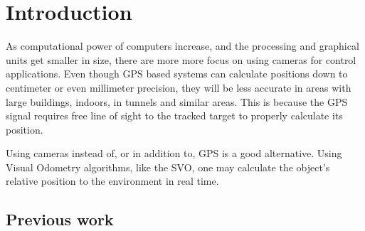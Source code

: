 
\chapter{Introduction} \label{sec:introduction}

As computational power of computers increase, and the processing and graphical units get smaller in size, there are more more focus on using cameras for control applications. Even though GPS based systems can calculate positions down to centimeter or even millimeter precision\cite{GPSaccuracy}, they will be less accurate in areas with large buildings, indoors, in tunnels and similar areas. This is because the GPS signal requires free line of sight to the tracked target to properly calculate its position.

Using cameras instead of, or in addition to, GPS is a good alternative. Using Visual Odometry algorithms, like the SVO\cite{SVOpaper}, one may calculate the object's relative position to the environment in real time.




\section{Previous work}



